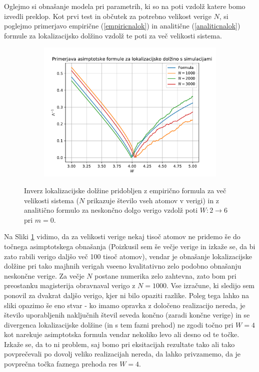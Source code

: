 Oglejmo si obnašanje modela pri parametrih, ki so na poti vzdolž katere bomo izvedli preklop. 
Kot prvi test in občutek za potrebno velikost verige $N$, si poglejmo primerjavo empirične (\ref{empiricnalok}) in analitične (\ref{analiticnalok}) formule za lokalizacijsko dolžino vzdolž te poti za več velikosti sistema.
\begin{figure}[H]
\centering
\begin{subfigure}{.7\textwidth}
\includegraphics[width=\linewidth]{Figures/locLength.pdf}
\end{subfigure}
\caption{Inverz lokalizacijske dolžine pridobljen z empirično formula za več velikosti sistema ($N$ prikazuje število vseh atomov v verigi) in z analitično formulo za neskončno dolgo verigo vzdolž poti $W: 2 \to 6$ pri $m=0$.}
\label{fig:locLength}
\end{figure}
Na Sliki \ref{fig:locLength} vidimo, da za velikosti verige nekaj tisoč atomov ne pridemo še do točnega asimptotskega obnašanja (Poizkusil sem še večje verige in izkaže se, da bi zato rabili verigo daljšo več 100 tisoč atomov), vendar je obnašanje lokalizacijske dolžine pri tako majhnih verigah vseeno kvalitativno zelo podobno obnašanju neskončne verige. Za večje $N$ postane numerika zelo zahtevna, zato bom pri preostanku magisterija obravnaval verigo z $N=1000$. Vse izračune, ki sledijo sem ponovil za dvakrat daljšo verigo, kjer ni bilo opaziti razlike. Poleg tega lahko na sliki opazimo še eno stvar - ko imamo opravka z določeno realizacijo nereda, je število uporabljenih naključnih števil seveda končno (zaradi končne verige) in se divergenca lokalizacijske dolžine (in s tem fazni prehod) ne zgodi točno pri $W=4$ kot narekuje asimptotska formula vendar nekoliko levo ali desno od te točke. Izkaže se, da to ni problem, saj bomo pri eksitacijah rezultate tako ali tako povprečevali po dovolj veliko realizacijah nereda, da lahko privzamemo, da je povprečna točka faznega prehoda res $W=4$.

